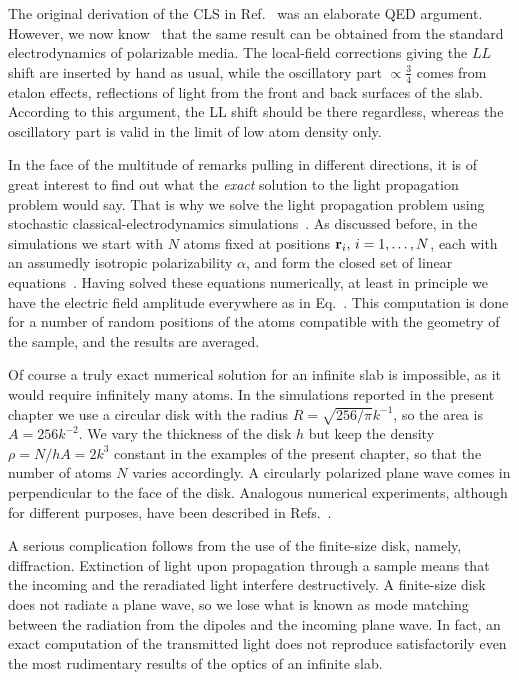 The original derivation of the CLS in Ref.~\cite{FRIEDBERG1973101}  was an elaborate QED argument. However, we now know~\cite{PhysRevLett.108.173601,Javanainen:16} that the same result can be obtained from the standard electrodynamics of polarizable media. The local-field corrections giving the $LL$ shift are inserted by hand as usual, while the oscillatory part $\propto\frac{3}{4}$ comes from etalon effects, reflections of light from the front and back surfaces of the slab. According to this argument, the LL shift should be there regardless, whereas the oscillatory part is valid in the limit of low atom density only.

In the face of the multitude of remarks pulling in different directions, it is of great interest to find out what the {\em exact\/} solution to the light propagation problem would say. That is why we solve the light propagation problem using stochastic classical-electrodynamics simulations~\cite{PhysRevA.59.649,PhysRevE.69.026605,PhysRevLett.101.103602,1367-2630-14-5-055001,PhysRevA.86.031602,PhysRevB.86.085116,PhysRevB.86.205128,PhysRevA.88.033844}. As discussed before, in the simulations we start with $N$ atoms fixed at positions ${\bf r}_i,\, i=1,\dots,N$, each with an assumedly isotropic polarizability $\alpha$, and form the closed set of linear equations~. Having solved these equations numerically, at least in principle we have the electric field amplitude everywhere as in Eq.~. This computation is done for a number of random positions of the atoms compatible with the geometry of the sample, and the results are averaged.

Of course a truly exact numerical solution for an infinite slab is impossible, as it would require infinitely many atoms. In the simulations reported in the present chapter we use a circular disk with the radius $R=\sqrt{256/\pi}k^{-1}$, so the area is $A=256k^{-2}$. We vary the thickness of the disk $h$ but keep the density $\rho=N/hA=2k^3$ constant in the examples of the present chapter, so that the number of atoms $N$ varies accordingly. A circularly polarized plane wave comes in perpendicular to the face of the disk. Analogous numerical experiments, although for different purposes, have been described in Refs.~\cite{1367-2630-14-5-055001,PhysRevA.86.031602}.  

A serious complication follows from the use of the finite-size disk, namely, diffraction. Extinction of light upon propagation through a sample means that the incoming and the reradiated light interfere destructively. A finite-size disk does not radiate a plane wave, so we lose what is known as mode matching between the radiation from the dipoles and the incoming plane wave. In fact, an exact computation of the transmitted light does not reproduce satisfactorily even the most rudimentary results of the optics of an infinite slab.

